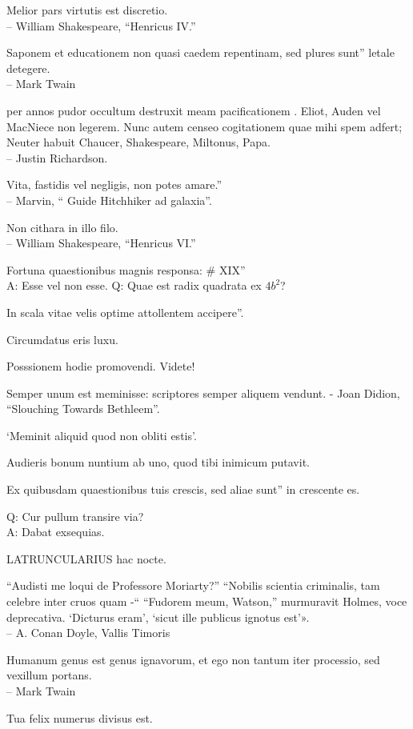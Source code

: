 \documentclass[titlepage,12pt]{memoir}
\begin{document}
Melior pars virtutis est discretio.
\\-- William Shakespeare, “Henricus IV.”

Saponem et educationem non quasi caedem repentinam, sed plures sunt”
letale detegere.
\\-- Mark Twain

 per annos pudor occultum destruxit meam pacificationem .
Eliot, Auden vel MacNiece non legerem.
Nunc autem censeo cogitationem quae mihi spem adfert;
Neuter habuit Chaucer, Shakespeare, Miltonus, Papa.
\\-- Justin Richardson.

Vita, fastidis vel negligis, non potes amare.”
\\-- Marvin, “ Guide Hitchhiker ad galaxia”.

Non cithara in illo filo.
\\-- William Shakespeare, “Henricus VI.”

Fortuna quaestionibus magnis responsa: \# XIX”\\
A: Esse vel non esse.
Q: Quae est radix quadrata ex \(4b^2\)?

In scala vitae velis optime attollentem accipere”.

 Circumdatus eris luxu.

Posssionem hodie promovendi. Videte!

Semper unum est meminisse: scriptores semper aliquem vendunt. - Joan Didion, “Slouching Towards Bethleem”.

‘Meminit aliquid quod non obliti estis’.

Audieris bonum nuntium ab uno, quod tibi inimicum putavit.

Ex quibusdam quaestionibus tuis crescis, sed aliae sunt”
in crescente es.

Q: Cur pullum transire via?\\
A: Dabat exsequias.

LATRUNCULARIUS hac nocte.

 “Audisti me loqui de Professore Moriarty?”
“Nobilis scientia criminalis, tam celebre inter cruos quam -“
“Fudorem meum, Watson,” murmuravit Holmes, voce deprecativa.
‘Dicturus eram’, ‘sicut ille publicus ignotus est’».
\\-- A. Conan Doyle, Vallis Timoris

Humanum genus est genus ignavorum, et ego non tantum iter
processio, sed vexillum portans.
\\-- Mark Twain

Tua felix numerus divisus est.
\end{document}
